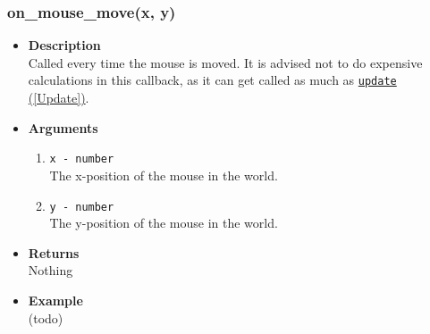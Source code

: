 \documentclass[12pt,a4paper]{article}
\begin{document}
\subsubsection{on\_mouse\_move(x, y)}\label{OnMouseMove}
\begin{itemize}
	\item[]{\bf Description}
			\\ Called every time the mouse is moved. It is advised not to do expensive calculations in this callback, as it can get called as much as \hyperref[Update]{\texttt{update} (\ref{Update})}.
	\item[]{\bf Arguments}
		\begin{enumerate}
			\item{\texttt{x - number}}
				\\ The x-position of the mouse in the world.
			\item{\texttt{y - number}}
				\\ The y-position of the mouse in the world.
		\end{enumerate}
	\item[]{\bf Returns}
		\\ Nothing
	\item[]{\bf Example}
		\\ (todo) 
\end{itemize}
\end{document}
